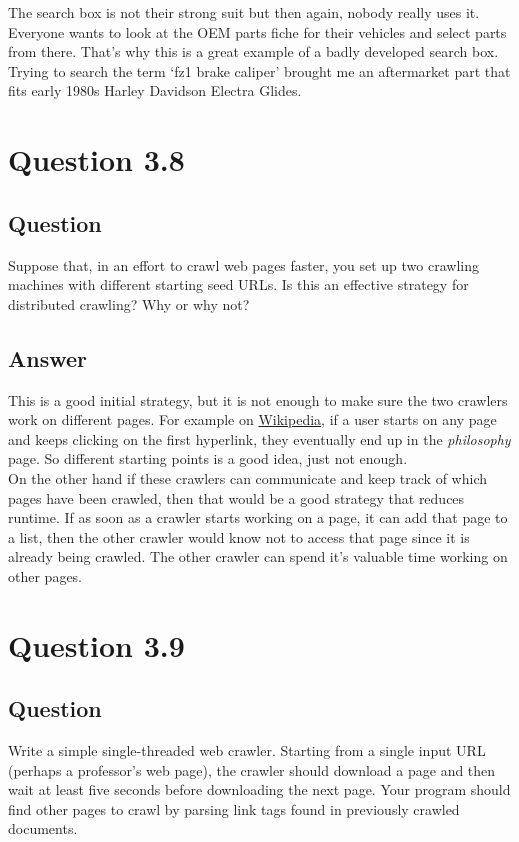 \documentclass[10pt,letterpaper,bibliography=totoc]{scrartcl}
\begin{document}
The search box is not their strong suit but then again, nobody really uses it. Everyone wants to look at the OEM parts fiche for their vehicles and select parts from there. That's why this is a great example of a badly developed search box. Trying to search the term `fz1 brake caliper' brought me an aftermarket part that fits early 1980s Harley Davidson Electra Glides. 

\section{Question 3.8}
\subsection{Question}
Suppose that, in an effort to crawl web pages faster, you set up two crawling machines with different starting seed URLs. Is this an effective strategy for distributed crawling? Why or why not?

\subsection{Answer}
This is a good initial strategy, but it is not enough to make sure the two crawlers work on different pages. For example on \href{www.wikipedia.org}{Wikipedia}, if a user starts on any page and keeps clicking on the first hyperlink, they eventually end up in the \textit{philosophy} page. So different starting points is a good idea, just not enough. \\

On the other hand if these crawlers can communicate and keep track of which pages have been crawled, then that would be a good strategy that reduces runtime. If as soon as a crawler starts working on a page, it can add that page to a list, then the other crawler would know not to access that page since it is already being crawled. The other crawler can spend it's valuable time working on other pages.

\section{Question 3.9}
\subsection{Question}
Write a simple single-threaded web crawler. Starting from a single input URL (perhaps a professor's web page), the crawler should download a page and then wait at least five seconds before downloading the next page. Your program should find other pages to crawl by parsing link tags found in previously crawled documents.
\end{document}
